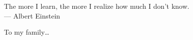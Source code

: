 \cleardoublepage
\thispagestyle{empty}


\vspace*{3cm}

\begin{raggedleft}
    	The more I learn, the more I realize how much I don't know.\\
     --- Albert Einstein\\
\end{raggedleft}

\vspace{4cm}

\begin{center}
    To my family\dots
\end{center}



